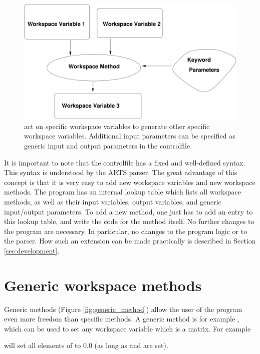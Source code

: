 \begin{figure}
  \begin{center}
    \includegraphics[width=\hsize,draft=false]{method}
    \caption{ act on specific workspace variables to
        generate other specific workspace variables. Additional input
        parameters can be specified as generic input and output parameters
        in the controlfile.}
    \label{fig:method}
  \end{center}
\end{figure}

It is important to note that the controlfile has a fixed and
well-defined syntax. This syntax is understood by the ARTS parser.
The great advantage of this concept is that it is very easy to add
new workspace variables and new workspace methods. The program has
an internal lookup table which lists all workspace methods, as well
as their input variables, output variables, and generic input/output
parameters. To add a new method, one just has to add an entry to
this lookup table, and write the code for the method itself. No
further changes to the program are necessary. In particular, no
changes to the program logic or to the parser. How such an extension
can be made practically is described in Section \ref{sec:development}.


\section{Generic workspace methods}
\label{sec:concept:generic}

Generic methods (Figure \ref{fig:generic_method}) allow the user of
the program even more freedom than specific methods. A generic method
is for example , which can be used to set any
workspace variable which is a matrix. For example
\begin{quote}
\end{quote}
will set all elements of  to 0.0 (as long as
 and  are set).

